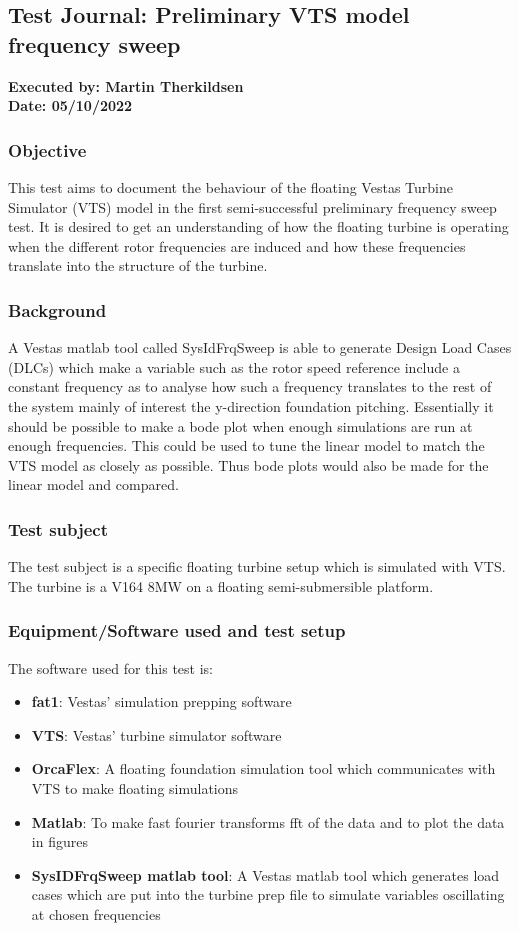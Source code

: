 \subsection{Test Journal: Preliminary VTS model frequency sweep} \label{app:tj_00}

\textbf{Executed by: Martin Therkildsen} \\
\textbf{Date: 05/10/2022}

\subsubsection*{Objective}
This test aims to document the behaviour of the floating Vestas Turbine Simulator (VTS) model in the first semi-successful preliminary frequency sweep test. It is desired to get an understanding of how the floating turbine is operating when the different rotor frequencies are induced and how these frequencies translate into the structure of the turbine. 

\subsubsection*{Background}
A Vestas matlab tool called SysIdFrqSweep is able to generate Design Load Cases (DLCs) which make a variable such as the rotor speed reference include a constant frequency as to analyse how such a frequency translates to the rest of the system mainly of interest the y-direction foundation pitching. Essentially it should be possible to make a bode plot when enough simulations are run at enough frequencies. This could be used to tune the linear model to match the VTS model as closely as possible. Thus bode plots would also be made for the linear model and compared.

\subsubsection*{Test subject}
The test subject is a specific floating turbine setup which is simulated with VTS. The turbine is a V164 8MW on a floating semi-submersible platform.

\subsubsection*{Equipment/Software used and test setup}
The software used for this test is:
\begin{itemize}
	\item \textbf{fat1}: Vestas' simulation prepping software
	\item \textbf{VTS}: Vestas' turbine simulator software
	\item \textbf{OrcaFlex}: A floating foundation simulation tool which communicates with VTS to make floating simulations
	\item \textbf{Matlab}: To make fast fourier transforms fft of the data and to plot the data in figures
	\item \textbf{SysIDFrqSweep matlab tool}: A Vestas matlab tool which generates load cases which are put into the turbine prep file to simulate variables oscillating at chosen frequencies
\end{itemize}


